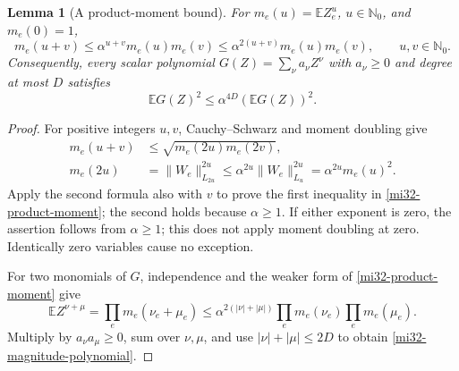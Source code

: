 \documentclass[11pt]{article}
\newtheorem{lemma}[theorem]{Lemma}
\theoremstyle{definition}
\theoremstyle{remark}
\newcommand{\E}{\mathbb E}
\newcommand{\norm}[1]{\lVert#1\rVert}
\begin{document}
\begin{lemma}[A product-moment bound]
\label{mi32-product-moment-lemma}
For $m_e(u)=\E Z_e^u$, $u\in\mathbb N_0$, and $m_e(0)=1$,
\begin{equation}\label{mi32-product-moment}
 m_e(u+v)\le\alpha^{u+v}m_e(u)m_e(v)
          \le\alpha^{2(u+v)}m_e(u)m_e(v),
 \qquad u,v\in\mathbb N_0.
\end{equation}
Consequently, every scalar polynomial
$G(Z)=\sum_\nu a_\nu Z^\nu$ with $a_\nu\ge0$ and degree at most
$D$ satisfies
\begin{equation}\label{mi32-magnitude-polynomial}
 \E G(Z)^2\le\alpha^{4D}(\E G(Z))^2.
\end{equation}
\end{lemma}
\begin{proof}
For positive integers $u,v$, Cauchy--Schwarz and moment doubling give
\[
 \begin{aligned}
 m_e(u+v)&\le\sqrt{m_e(2u)m_e(2v)},\\
 m_e(2u)&=\norm{W_e}_{L_{2u}}^{2u}
        \le\alpha^{2u}\norm{W_e}_{L_u}^{2u}
         =\alpha^{2u}m_e(u)^2.
 \end{aligned}
\]
Apply the second formula also with $v$ to prove the first inequality in
\eqref{mi32-product-moment}; the second holds because $\alpha\ge1$.
If either exponent is zero, the assertion follows from $\alpha\ge1$;
this does not apply moment doubling at zero. Identically zero variables
cause no exception.

For two monomials of $G$, independence and the weaker form of
\eqref{mi32-product-moment} give
\[
 \E Z^{\nu+\mu}
 =\prod_e m_e(\nu_e+\mu_e)
 \le\alpha^{2(|\nu|+|\mu|)}
             \prod_e m_e(\nu_e)\prod_e m_e(\mu_e).
\]
Multiply by $a_\nu a_\mu\ge0$, sum over $\nu,\mu$, and use
$|\nu|+|\mu|\le2D$ to obtain \eqref{mi32-magnitude-polynomial}.
\end{proof}
\end{document}
